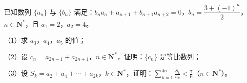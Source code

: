 \begin{question}
已知数列 $\{a_n\}$ 与 $\{b_n\}$ 满足：$b_na_n+a_{n+1}+b_{n+1}a_{n+2}=0$，$b_n=\dfrac{3+(-1)^n}{2}$，$n\in\mathbf{N}^*$，且 $a_1=2$，$a_2=4$。

（1）求 $a_3$，$a_4$，$a_5$ 的值；

（2）设 $c_n=a_{2n-1}+a_{2n+1}$，$n\in\mathbf{N}^*$，证明：$\{c_n\}$ 是等比数列；

（3）设 $S_k=a_2+a_4+\cdots+a_{2k}$，$k\in\mathbf{N}^*$，证明：$\displaystyle\sum_{k=1}^{4n}\frac{S_k}{a_k}<\frac76$（$n\in\mathbf{N}^*$）。

\end{question}